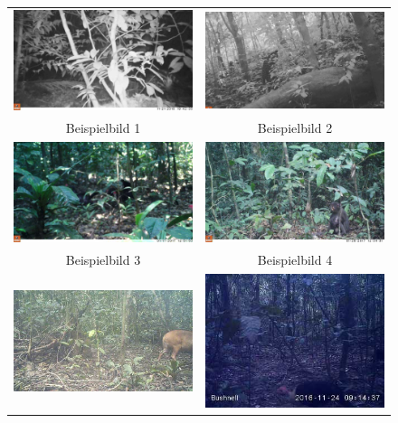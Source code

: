 \documentclass{article}
\begin{document}
\begin{figure}[!h]
\begin{tabular}{cc}
  \includegraphics[width=65mm]{images/example_images/ZJ016488.jpg} & \includegraphics[width=65mm]{images/example_images/ZJ016498.jpg} \\
Beispielbild 1 & Beispielbild 2 \\[6pt]
 \includegraphics[width=65mm]{images/example_images/ZJ016503.jpg} & \includegraphics[width=65mm]{images/example_images/ZJ016535.jpg} \\
Beispielbild 3 & Beispielbild 4 \\[6pt]
 \includegraphics[width=65mm]{images/example_images/ZJ016561.jpg} & \includegraphics[width=65mm]{images/example_images/ZJ016556.jpg} \\

\end{tabular}
\end{figure}
\end{document}
